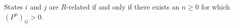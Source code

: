 States $i$ and $j$ are $R$-related if and only if there exists an $n \geq 0$ for which $(P^n)_{ij} > 0$.
